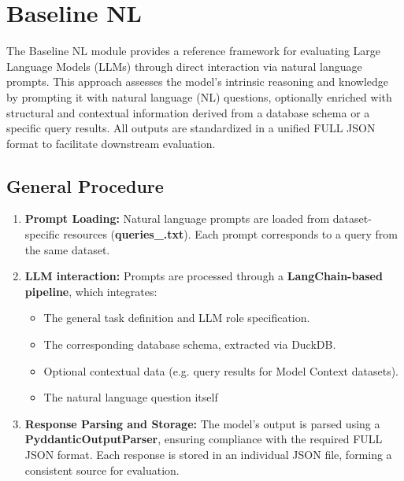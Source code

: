 \section{Baseline NL}
The Baseline NL module provides a reference framework for evaluating Large Language Models (LLMs) through direct interaction via natural language prompts.
This approach assesses the model’s intrinsic reasoning and knowledge by prompting it with natural language (NL) questions, optionally enriched with structural and contextual information derived from a database schema or a specific query results.
All outputs are standardized in a unified FULL JSON format to facilitate downstream evaluation.

\subsection{General Procedure}
\begin{enumerate}
    \item  \textbf{Prompt Loading:} Natural language prompts are loaded from dataset-specific resources (\textbf{queries\_<dataset-name>.txt}). Each prompt corresponds to a query from the same dataset.
    \item \textbf{LLM interaction:} Prompts are processed through a \textbf{LangChain-based pipeline}, which integrates:
    \begin{itemize}
        \item The general task definition and LLM role specification.
        \item The corresponding database schema, extracted via DuckDB.
        \item Optional contextual data (e.g. query results for Model Context datasets).
        \item The natural language question itself
    \end{itemize}
    \item \textbf{Response Parsing and Storage:} The model's output is parsed using a \textbf{PyddanticOutputParser}, ensuring compliance with the required FULL JSON format. Each response is stored in an individual JSON file, forming a consistent source for evaluation.
\end{enumerate}


